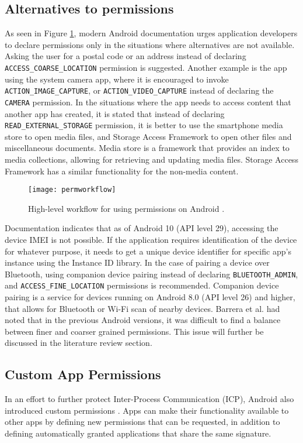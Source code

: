 \documentclass[
  a4paper,  %
  twoside,  %
  bibliography=totoc,
  headsepline,
  cleardoublepage=empty,
  parskip=half,
  draft=false,
  open=any
]{scrbook}
\begin{document}
\subsection{Alternatives to permissions}
As seen in Figure \ref{workflow}, modern Android documentation urges application developers to declare permissions only in the situations where alternatives are not available. Asking the user for a postal code or an address instead of declaring \texttt{ACCESS\_COARSE\_LOCATION} permission is suggested. Another example is the app using the system camera app, where it is encouraged to invoke \texttt{ACTION\_IMAGE\_CAPTURE}, or \texttt{ACTION\_VIDEO\_CAPTURE} instead of declaring the \texttt{CAMERA} permission. In the situations where the app needs to access content that another app has created, it is stated that instead of declaring \texttt{READ\_EXTERNAL\_STORAGE} permission, it is better to use the smartphone media store to open media files, and Storage Access Framework to open other files and miscellaneous documents. Media store is a framework that provides an index to media collections, allowing for retrieving and updating media files. Storage Access Framework has a similar functionality for the non-media content.
\begin{figure}\centering
	\texttt{[image: permworkflow]}
	\caption{High-level workflow for using permissions on Android \cite{devAndroid}.}
	\label{workflow}
\end{figure} 
Documentation indicates that as of Android 10 (API level 29), accessing the device IMEI is not possible. If the application requires identification of the device for whatever purpose, it needs to get a unique device identifier for specific app's instance using the Instance ID library. In the case of pairing a device over Bluetooth, using companion device pairing instead of declaring \texttt{BLUETOOTH\_ADMIN}, and \texttt{ACCESS\_FINE\_LOCATION} permissions is recommended. Companion device pairing is a service for devices running on Android 8.0 (API level 26) and higher, that allows for Bluetooth or Wi-Fi scan of nearby devices. Barrera et al. had noted that in the previous Android versions, it was difficult to find a balance between finer and coarser grained permissions. This issue will further be discussed in the literature review section.

\subsection{Custom App Permissions}
In an effort to further protect Inter-Process Communication (ICP), Android also introduced custom permissions \cite{customAndroid}. Apps can make their functionality available to other apps by defining new permissions that can be requested, in addition to defining automatically granted applications that share the same signature.
\end{document}
